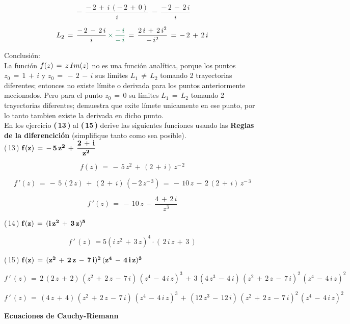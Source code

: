 \documentclass[a4paper,11pt,openany]{book}
\begin{document}
$$=\,\dfrac{-\,2\,+\,i\,(-\,2\,+\,0)}{i}\,=\,\dfrac{-\,2\,-\,2\,i}{i}$$

$$L_{2}\,=\,\dfrac{-\,2\,-\,2\,i}{i}\,\textcolor{cadmiumgreen}{\times\,\dfrac{-\,i}{-\,i}}\,=\,\dfrac{2\,i\,+\,2\,i^{2}}{-\,i^{2}}\,=\,-\,2\,+\,2\,i$$

\textcolor{ao(english)}{} Conclusión:\\

La función $f(z)\,=\,z\,\mathnormal{Im}(z)$ no es una función analítica, porque los puntos $z_{0}\,=\,1\,+\,i$ y $z_{0}\,=\,-\,2\,-\,i$ sus límites $L_{1}\,\neq\,L_{2}$ tomando 2 trayectorias diferentes; entonces no existe límite o derivada para los puntos anteriormente mecionados. Pero para el punto $z_{0}\,=\,0$ su límites $L_{1}\,=\,L_{2}$ tomando 2 trayectorias diferentes; demuestra que exite límete unicamente en ese punto, por lo tanto tambien existe la derivada en dicho punto.\\

En los ejercicio \textbf{(\,13\,)} al \textbf{(\,15\,)} derive las siguientes funciones usando las \textbf{Reglas de la diferencición} (simplifique tanto como sea posible).\\

\textcolor{ao(english)}{(\,13\,)} $\bf{f(z)\,=\,-\,5\,z^{2}\,+\,\dfrac{2\,+\,i}{z^{2}}}$

$$f(z)\,=\,-\,5\,z^{2}\,+\,(2\,+\,i)\,z^{-\,2}$$

$$f\,'(z)\,=\,-\,5\,(2\,z)\,+\,(2\,+\,i)\,(-\,2\,z^{-\,3})\,=\,-\,10\,z\,-\,2\,(2\,+\,i)\,z^{-\,3}$$

$$f\,'(z)\,=\,-\,10\,z\,-\,\dfrac{4\,+\,2\,i}{z^{3}}$$

\textcolor{ao(english)}{(\,14\,)} $\bf{f(z)\,=\,(i\,z^{2}\,+\,3\,z)^{5}}$

$$ \boxed{f\,'\,(z)\,= 5(i\,z^{2}\,+\,3\,z)^{4} \cdot (\,2\,i\,z\,+\,3\,)} $$

\textcolor{ao(english)}{(\,15\,)} $\bf{f(z)\,=\,(z^{2}\,+\,2\,z\,-\,7\,i)^{2}\,(z^{4}\,-\,4\,i\,z)^{3}}$

$$f\,'\,(z)\,=\,2\,(2\,z\,+\,2)\,(z^{2}\,+\,2\,z\,-\,7\,i)\,(z^{4}\,-\,4\,i\,z)^{3}\,+\,3\,(4\,z^{3}\,-\,4\,i)\,(z^{2}\,+\,2\,z\,-\,7\,i)^{2}\,(z^{4}\,-\,4\,i\,z)^{2}$$

$$f\,'\,(z)\,=\,(4\,z\,+\,4)\,(z^{2}\,+\,2\,z\,-\,7\,i)\,(z^{4}\,-\,4\,i\,z)^{3}\,+\,(12\,z^{3}\,-\,12\,i)\,(z^{2}\,+\,2\,z\,-\,7\,i)^{2}\,(z^{4}\,-\,4\,i\,z)^{2}$$

\begin{center}
\textbf{Ecuaciones de Cauchy-Riemann}
\end{center}
\end{document}
